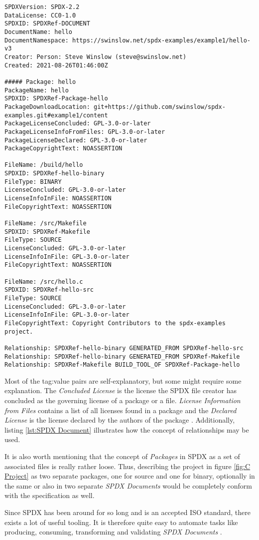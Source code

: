 \noindent
\begin{lstlisting}[caption=SPDX Document, captionpos=b, label=lst:SPDX Document]
SPDXVersion: SPDX-2.2
DataLicense: CC0-1.0
SPDXID: SPDXRef-DOCUMENT
DocumentName: hello
DocumentNamespace: https://swinslow.net/spdx-examples/example1/hello-v3
Creator: Person: Steve Winslow (steve@swinslow.net)
Created: 2021-08-26T01:46:00Z

##### Package: hello
PackageName: hello
SPDXID: SPDXRef-Package-hello
PackageDownloadLocation: git+https://github.com/swinslow/spdx-examples.git#example1/content
PackageLicenseConcluded: GPL-3.0-or-later
PackageLicenseInfoFromFiles: GPL-3.0-or-later
PackageLicenseDeclared: GPL-3.0-or-later
PackageCopyrightText: NOASSERTION

FileName: /build/hello
SPDXID: SPDXRef-hello-binary
FileType: BINARY
LicenseConcluded: GPL-3.0-or-later
LicenseInfoInFile: NOASSERTION
FileCopyrightText: NOASSERTION

FileName: /src/Makefile
SPDXID: SPDXRef-Makefile
FileType: SOURCE
LicenseConcluded: GPL-3.0-or-later
LicenseInfoInFile: GPL-3.0-or-later
FileCopyrightText: NOASSERTION

FileName: /src/hello.c
SPDXID: SPDXRef-hello-src
FileType: SOURCE
LicenseConcluded: GPL-3.0-or-later
LicenseInfoInFile: GPL-3.0-or-later
FileCopyrightText: Copyright Contributors to the spdx-examples project.

Relationship: SPDXRef-hello-binary GENERATED_FROM SPDXRef-hello-src
Relationship: SPDXRef-hello-binary GENERATED_FROM SPDXRef-Makefile
Relationship: SPDXRef-Makefile BUILD_TOOL_OF SPDXRef-Package-hello
\end{lstlisting}

\noindent
Most of the tag:value pairs are self-explanatory, but some might require some explanation. The \textit{Concluded License} is the license the SPDX file creator has concluded as the governing license of a package or a file. \textit{License Information from Files} contains a list of all licenses found in a package and the \textit{Declared License} is the license declared by the authors of the package \cite{SPDXSpec}. Additionally, listing \ref{lst:SPDX Document} illustrates how the concept of relationships may be used.\par
It is also worth mentioning that the concept of \textit{Packages} in SPDX as a set of associated files is really rather loose. Thus, describing the project in figure \ref{fig:C Project} as two separate packages, one for source and one for binary, optionally in the same or also in two separate \textit{SPDX Documents} would be completely conform with the specification as well.\par
Since SPDX has been around for so long and is an accepted ISO standard, there exists a lot of useful tooling. It is therefore quite easy to automate tasks like producing, consuming, transforming and validating \textit{SPDX Documents} \cite{SPDXWebsite}.\\
 
